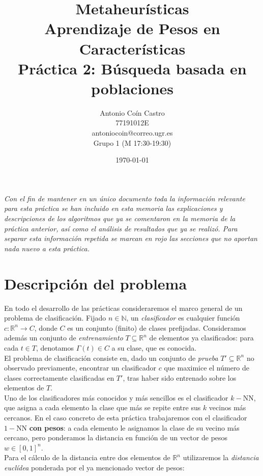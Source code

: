 \documentclass[12pt]{article}
\title{Metaheurísticas\\ \Large Aprendizaje de Pesos en Características \\ \large Práctica 2: Búsqueda basada en poblaciones}
\author{Antonio Coín Castro \\ 77191012E \\ antoniocoin@correo.ugr.es \\ Grupo 1 (M 17:30-19:30)}
\date{\today}
\begin{document}
\maketitle
\tableofcontents

\newpage

\textit{Con el fin de mantener en un único documento toda la información relevante para esta práctica se han incluido en esta memoria las explicaciones y descripciones de los algoritmos que ya se comentaron en la memoria de la práctica anterior, así como el análisis de resultados que ya se realizó. Para separar esta información repetida se marcan en {\color{red}rojo} las secciones que no aportan nada nuevo a esta práctica.}
\restoregeometry

\newpage

\section{Descripción del problema}

En todo el desarrollo de las prácticas consideraremos el marco general de un problema de clasificación. Fijado $n \in \mathbb{N}$, un \textit{clasificador} es cualquier función $c: \mathbb{R}^n \to C$, donde $C$ es un conjunto (finito) de clases prefijadas. Consideramos además un conjunto de \textit{entrenamiento} $T \subseteq \mathbb{R}^n$ de elementos ya clasificados: para cada $t \in T$, denotamos $\Gamma(t) \in C$ a su clase, que es conocida.\\

El problema de clasificación consiste en, dado un conjunto de \textit{prueba} $T'\subseteq \mathbb{R}^n$ no observado previamente, encontrar un clasificador $c$ que maximice el número de clases correctamente clasificadas en $T'$, tras haber sido entrenado sobre los elementos de $T$.\\

Uno de los clasificadores más conocidos y más sencillos es el clasificador $k-$NN, que asigna a cada elemento la clase que más se repite entre sus $k$ vecinos más cercanos. En el caso concreto de esta práctica trabajaremos con el clasificador $1-$NN \textbf{con pesos}: a cada elemento le asignamos la clase de su vecino más cercano, pero ponderamos la distancia en función de un vector de pesos $w \in [0,1]^n$.\\

Para el cálculo de la distancia entre dos elementos de $\mathbb{R}^n$ utilizaremos la \textit{distancia euclídea} ponderada por el ya mencionado vector de pesos:
\end{document}
